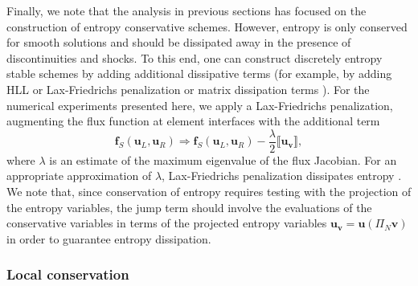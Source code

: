 \documentclass[preprint,10pt]{elsarticle}
\theoremstyle{definition}
\theoremstyle{lemma}
\theoremstyle{theorem}
\theoremstyle{assumption}
\newcommand{\LRp}[1]{\left( #1 \right)}
\newcommand{\jump}[1] {\ensuremath{\llbracket#1\rrbracket}}
\newcommand{\note}[1]{{\color{blue}{#1}}}
\begin{document}
Finally, we note that the analysis in previous sections has focused on the construction of entropy conservative schemes.  However, entropy is only conserved for smooth solutions and should be dissipated away in the presence of discontinuities and shocks.  To this end, one can construct discretely entropy stable schemes by adding additional dissipative terms (for example, by adding HLL or Lax-Friedrichs penalization \cite{chen2017entropy} or matrix dissipation terms \cite{chandrashekar2013kinetic, winters2017uniquely}).  For the numerical experiments presented here, we apply a Lax-Friedrichs penalization, augmenting the flux function at element interfaces with the additional term
\[
 \bm{f}_S\LRp{\bm{u}_L,\bm{u}_R}\Rightarrow \bm{f}_S\LRp{\bm{u}_L,\bm{u}_R} - \frac{\lambda}{2}\jump{\bm{u}_{\bm{v}}},
\]
where $\lambda$ is an estimate of the maximum eigenvalue of the flux Jacobian.  For an appropriate approximation of $\lambda$, Lax-Friedrichs penalization dissipates entropy \cite{chen2017entropy}.  We note that, since conservation of entropy requires testing with the projection of the entropy variables, the jump term should involve the evaluations of the conservative variables in terms of the projected entropy variables $\bm{u}_{\bm{v}} = \bm{u}\LRp{\Pi_N \bm{v}}$ in order to guarantee entropy dissipation.  


\subsubsection{Local conservation}
\end{document}
